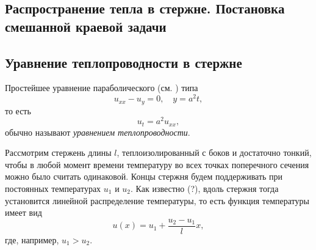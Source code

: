 \subsection{Распространение тепла в стержне. Постановка смешанной краевой задачи}
\subsection*{Уравнение теплопроводности в стержне}
Простейшее уравнение параболического (см. ) типа 
\begin{equation}
  \label{eq:teplo_eq}
  u_{xx} - u_y = 0, \quad y = a^2t,
\end{equation}
то есть 
\[
  u_t = a^2u_{xx},
\]
обычно называют \emph{уравнением теплопроводности}.

Рассмотрим стержень длины $ l $, теплоизолированный с боков и 
достаточно тонкий, чтобы в любой момент времени температуру во всех 
точках поперечного сечения можно было считать одинаковой. Концы стержня будем
поддерживать при постоянных температурах $ u_1 $ и $ u_2 $. Как известно (?),
вдоль стержня тогда установится линейной распределение температуры, то есть
функция температуры имеет вид
\[
  u(x) = u_1 + \frac{u_2 - u_1}{l}x,
\]
где, например, $ u_1 > u_2 $.

